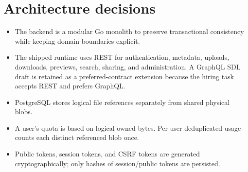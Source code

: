 \documentclass[11pt,a4paper]{article}
\begin{document}
\section{Architecture decisions}
\begin{itemize}[leftmargin=*]
  \item The backend is a modular Go monolith to preserve transactional consistency while keeping domain boundaries explicit.
  \item The shipped runtime uses REST for authentication, metadata, uploads, downloads, previews, search, sharing, and administration. A GraphQL SDL draft is retained as a preferred-contract extension because the hiring task accepts REST and prefers GraphQL.
  \item PostgreSQL stores logical file references separately from shared physical blobs.
  \item A user's quota is based on logical owned bytes. Per-user deduplicated usage counts each distinct referenced blob once.
  \item Public tokens, session tokens, and CSRF tokens are generated cryptographically; only hashes of session/public tokens are persisted.
\end{itemize}
\end{document}
